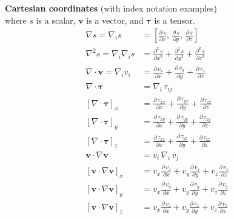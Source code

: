 \begin{datasheet}
\vspace{\baselineskip}
{\bf Cartesian coordinates} (with index notation examples)\\
where $s$ is a scalar, $\bm{v}$ is a vector, and $\bm{\tau}$ is a tensor.
\begin{align*}
  \nabla s = \nabla_i s &= \left[\frac{\partial\,s}{\partial x},\,
  \frac{\partial\,s}{\partial y},\, \frac{\partial\,s}{\partial z}\right]
  \\
  \nabla^2 s = \nabla_i\nabla_i s &=\frac{\partial^2\,s}{\partial x^2} +
  \frac{\partial^2\,s}{\partial y^2}+ \frac{\partial^2\,s}{\partial z^2}
  \\
  \nabla\cdot\bm{v} =\nabla_i v_i &= \frac{\partial\,v_x}{\partial x} +
  \frac{\partial\,v_y}{\partial y}+ \frac{\partial\,v_z}{\partial z}
  \\
  \nabla \cdot \bm{\tau} &= \nabla_i\, \tau_{ij}
  \\
  \left[\nabla \cdot \bm{\tau}\right]_x &= \frac{\partial\,\tau_{xx}}{\partial x} +
  \frac{\partial\, \tau_{yx}}{\partial y} + \frac{\partial\, \tau_{zx}}{\partial z}
  \\
  \left[\nabla \cdot \bm{\tau}\right]_y &= \frac{\partial\,\tau_{xy}}{\partial x} +
  \frac{\partial\, \tau_{yy}}{\partial y} + \frac{\partial\, \tau_{zy}}{\partial z}
  \\
  \left[\nabla \cdot \bm{\tau}\right]_z &= \frac{\partial\,\tau_{xz}}{\partial x} +
  \frac{\partial\, \tau_{yz}}{\partial y} + \frac{\partial\, \tau_{zz}}{\partial z}
  \\
  \bm{v}\cdot \nabla \bm{v} &= v_i\,\nabla_i\,v_j
  \\
  \left[\bm{v}\cdot \nabla \bm{v}\right]_x &= v_x\frac{\partial\,v_x}{\partial x} + v_y\frac{\partial\,v_x}{\partial y} +v_z\frac{\partial\,v_x}{\partial z}
  \\
  \left[\bm{v}\cdot \nabla \bm{v}\right]_y &= v_x\frac{\partial\,v_y}{\partial x} + v_y\frac{\partial\,v_y}{\partial y} +v_z\frac{\partial\,v_y}{\partial z}
  \\
  \left[\bm{v}\cdot \nabla \bm{v}\right]_z &= v_x\frac{\partial\,v_z}{\partial x} + v_y\frac{\partial\,v_z}{\partial y} +v_z\frac{\partial\,v_z}{\partial z}
\end{align*}


\end{datasheet}
